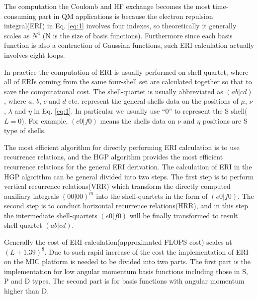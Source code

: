\documentclass[num-refs]{wiley-article}
\begin{document}
The computation the Coulomb and HF exchange becomes the most time-consuming
part in QM applications is because the electron repulsion integral(ERI) in Eq.
\ref{eq:1} involves four indexes, so theoretically it generally scales as
$N^{4}$ (N is the size of basis functions).  Furthermore since each basis
function is also a contraction of Gaussian functions, such ERI calculation
actually involves eight loops. 

In practice the computation of ERI is usually performed on shell-quartet,
where all of ERIs coming from the same four-shell set are calculated together
so that to save the computational cost. The shell-quartet is usually abbreviated 
as $(ab|cd)$, where $a$, $b$, $c$ and $d$ etc. represent the general shells data on
the positions of $\mu$, $\nu$, $\lambda$ and $\eta$ in Eq. \ref{eq:1}.
In particular we usually use ``0'' to represent the S shell($L=0$). For example,
$(e0|f0)$ means the shells data on $\nu$ and $\eta$ positions are S type of shells.

The most efficient algorithm for directly performing ERI calculation is to use
recurrence relations\cite{gill1994molecular}, and the HGP algorithm\cite{HGP}
provides the most efficient recurrence relations for the general ERI
derivation.  The calculation of ERI in the HGP algorithm can be general divided
into two steps.  The first step is to perform vertical recurrence
relations(VRR) which transform the directly computed auxiliary integrals
$(00|00)^{m}$ into the shell-quartets in the form of $(e0|f0)$.  The second step is
to conduct horizontal recurrence relations(HRR), and in this step the intermediate
shell-quartets $(e0|f0)$ will be finally transformed to result shell-quartet
$(ab|cd)$.

Generally the cost of ERI calculation(approximated FLOPS cost) scales at
$(L+1.39)^{8}$\cite{shao2000improved}.  Due to such rapid increase of the cost
the implementation of ERI on the MIC platform is needed to be divided into two
parts. The first part is the implementation for low angular momentum basis
functions including those in S, P and D types.  The second part is for basis
functions with angular momentum higher than D.



%
%
%
%
%
%
%
\end{document}
